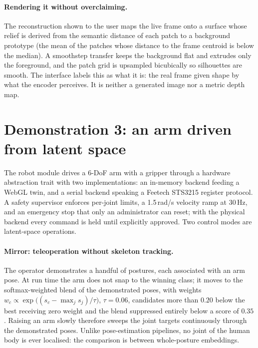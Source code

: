 \documentclass[11pt,onecolumn]{article}
\begin{document}
\paragraph{Rendering it without overclaiming.}
The reconstruction shown to the user maps the live frame onto a surface whose relief is
derived from the semantic distance of each patch to a background prototype (the mean of
the patches whose distance to the frame centroid is below the median). A smoothstep
transfer keeps the background flat and extrudes only the foreground, and the patch grid is
upsampled bicubically so silhouettes are smooth. The interface labels this as what it
is: the real frame given shape by what the encoder perceives. It is neither a generated
image nor a metric depth map.

\section{Demonstration 3: an arm driven from latent space}
\label{sec:robot}

The robot module drives a 6-DoF arm with a gripper through a hardware abstraction trait
with two implementations: an in-memory backend feeding a WebGL twin, and a serial backend
speaking a Feetech STS3215 register protocol. A safety supervisor enforces per-joint
limits, a 1.5\,rad/s velocity ramp at 30\,Hz, and an emergency stop that only an
administrator can reset; with the physical backend every command is held until explicitly
approved. Two control modes are latent-space operations.

\paragraph{Mirror: teleoperation without skeleton tracking.}
The operator demonstrates a handful of postures, each associated with an arm pose. At run
time the arm does not snap to the winning class; it moves to the softmax-weighted blend of
the demonstrated poses, with weights
$w_c \propto \exp\big((s_c - \max_j s_j)/\tau\big)$, $\tau = 0.06$, candidates more than
$0.20$ below the best receiving zero weight and the blend suppressed entirely below a
score of $0.35$. Raising an arm slowly therefore sweeps the joint targets continuously
through the demonstrated poses. Unlike pose-estimation pipelines, no joint of the human
body is ever localised: the comparison is between whole-posture embeddings.
\end{document}
